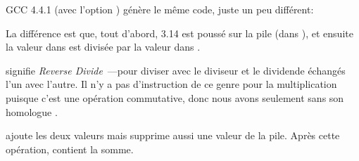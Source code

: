﻿

GCC 4.4.1 (avec l'option \Othree) génère le même code, juste un peu différent:



La différence est que, tout d'abord, 3.14 est poussé sur la pile (dans ), et
ensuite la valeur dans  est divisée par la valeur dans .


\FDIVR signifie \emph{Reverse Divide}~---pour diviser avec le diviseur et le dividende
échangés l'un avec l'autre.
Il n'y a pas d'instruction de ce genre pour la multiplication puisque c'est une opération
commutative, donc nous avons seulement \FMUL sans son homologue .


\FADDP ajoute les deux valeurs mais supprime aussi une valeur de la pile.
Après cette opération,  contient la somme.

